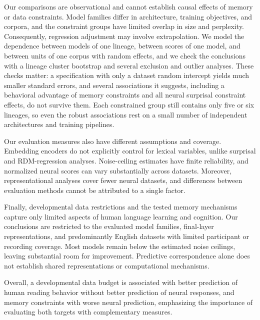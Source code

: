 Our comparisons are observational and cannot establish causal effects of memory or data constraints. Model families differ in architecture, training objectives, and corpora, and the constraint groups have limited overlap in size and perplexity. Consequently, regression adjustment may involve extrapolation. We model the dependence between models of one lineage, between scores of one model, and between units of one corpus with random effects, and we check the conclusions with a lineage cluster bootstrap and several exclusion and outlier analyses. These checks matter: a specification with only a dataset random intercept yields much smaller standard errors, and several associations it suggests, including a behavioral advantage of memory constraints and all neural surprisal constraint effects, do not survive them. Each constrained group still contains only five or six lineages, so even the robust associations rest on a small number of independent architectures and training pipelines.

Our evaluation measures also have different assumptions and coverage. Embedding encoders do not explicitly control for lexical variables, unlike surprisal and RDM-regression analyses. Noise-ceiling estimates have finite reliability, and normalized neural scores can vary substantially across datasets. Moreover, representational analyses cover fewer neural datasets, and differences between evaluation methods cannot be attributed to a single factor.

Finally, developmental data restrictions and the tested memory mechanisms capture only limited aspects of human language learning and cognition. Our conclusions are restricted to the evaluated model families, final-layer representations, and predominantly English datasets with limited participant or recording coverage. Most models remain below the estimated noise ceilings, leaving substantial room for improvement. Predictive correspondence alone does not establish shared representations or computational mechanisms.

Overall, a developmental data budget is associated with better prediction of human reading behavior without better prediction of neural responses, and memory constraints with worse neural prediction, emphasizing the importance of evaluating both targets with complementary measures.
